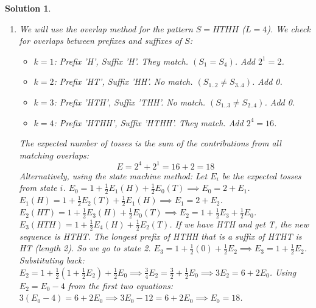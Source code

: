 \documentclass[12pt]{amsart}
\newtheorem*{solution}{Solution}
\begin{document}
\begin{solution}
\begin{enumerate}[label=(\alph*)]
\item We will use the overlap method for the pattern $S = HTHH$ ($L=4$). We check for overlaps between prefixes and suffixes of $S$:
\begin{itemize}
    \item $k=1$: Prefix 'H', Suffix 'H'. They match. $(S_1 = S_4)$. Add $2^1=2$.
    \item $k=2$: Prefix 'HT', Suffix 'HH'. No match. $(S_{1..2} \neq S_{3..4})$. Add 0.
    \item $k=3$: Prefix 'HTH', Suffix 'THH'. No match. $(S_{1..3} \neq S_{2..4})$. Add 0.
    \item $k=4$: Prefix 'HTHH', Suffix 'HTHH'. They match. Add $2^4=16$.
\end{itemize}
The expected number of tosses is the sum of the contributions from all matching overlaps:
$$ E = 2^4 + 2^1 = 16 + 2 = 18 $$
Alternatively, using the state machine method:
Let $E_i$ be the expected tosses from state $i$.
$E_0 = 1 + \frac{1}{2}E_1(H) + \frac{1}{2}E_0(T) \implies E_0 = 2+E_1$.
$E_1(H) = 1 + \frac{1}{2}E_2(T) + \frac{1}{2}E_1(H) \implies E_1 = 2+E_2$.
$E_2(HT) = 1 + \frac{1}{2}E_3(H) + \frac{1}{2}E_0(T) \implies E_2 = 1 + \frac{1}{2}E_3 + \frac{1}{2}E_0$.
$E_3(HTH) = 1 + \frac{1}{2}E_4(H) + \frac{1}{2}E_2(T)$. If we have HTH and get T, the new sequence is HTHT. The longest prefix of HTHH that is a suffix of HTHT is HT (length 2). So we go to state 2.
$E_3 = 1 + \frac{1}{2}(0) + \frac{1}{2}E_2 \implies E_3 = 1 + \frac{1}{2}E_2$.
Substituting back: $E_2 = 1 + \frac{1}{2}(1+\frac{1}{2}E_2) + \frac{1}{2}E_0 \implies \frac{3}{4}E_2 = \frac{3}{2}+\frac{1}{2}E_0 \implies 3E_2=6+2E_0$.
Using $E_2=E_0-4$ from the first two equations: $3(E_0-4)=6+2E_0 \implies 3E_0-12=6+2E_0 \implies E_0=18$.
\end{enumerate}
\end{solution}
\end{document}

